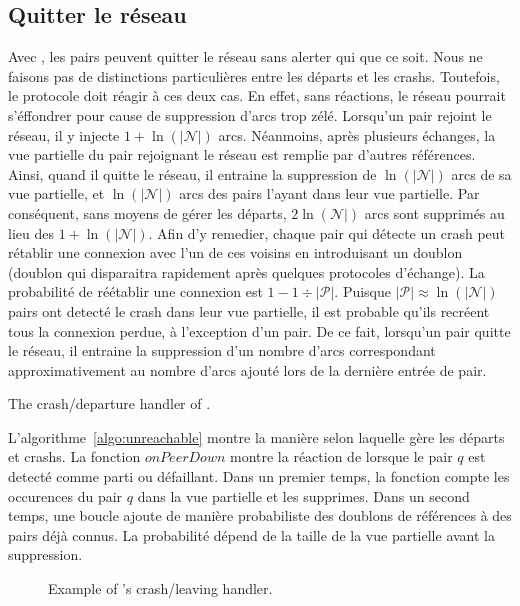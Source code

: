 \subsection{Quitter le réseau}

Avec \SPRAY, les pairs peuvent quitter le réseau sans alerter qui que ce
soit. Nous ne faisons pas de distinctions particulières entre les départs et les
crashs. Toutefois, le protocole doit réagir à ces deux cas. En effet, sans
réactions, le réseau pourrait s'éffondrer pour cause de suppression d'arcs trop
zélé. Lorsqu'un pair rejoint le réseau, il y injecte $1+\ln(|\mathcal{N}|)$
arcs. Néanmoins, après plusieurs échanges, la vue partielle du pair rejoignant
le réseau est remplie par d'autres références. Ainsi, quand il quitte le réseau,
il entraine la suppression de $\ln(|\mathcal{N}|)$ arcs de sa vue partielle, et
$\ln(|\mathcal{N}|)$ arcs des pairs l'ayant dans leur vue partielle. Par
conséquent, sans moyens de gérer les départs, $2\ln(\mathcal{N}|)$ arcs sont
supprimés au lieu des $1+\ln(|\mathcal{N}|)$. Afin d'y remedier, chaque pair qui
détecte un crash peut rétablir une connexion avec l'un de ces voisins en
introduisant un doublon (doublon qui disparaitra rapidement après quelques
protocoles d'échange). La probabilité de réétablir une connexion est
$1-1\div{|\mathcal{P}|}$. Puisque ${|\mathcal{P}|}\approx \ln(|\mathcal{N}|)$
pairs ont detecté le crash dans leur vue partielle, il est probable qu'ils
recréent tous la connexion perdue, à l'exception d'un pair. De ce fait,
lorsqu'un pair quitte le réseau, il entraine la suppression d'un nombre d'arcs
correspondant approximativement au nombre d'arcs ajouté lors de la dernière
entrée de pair.

\begin{algorithm}[h]
  
  \caption{\label{algo:unreachable}The crash/departure handler of \SPRAY.}
\end{algorithm}

L'algorithme~\ref{algo:unreachable} montre la manière selon laquelle \SPRAY gère
les départs et crashs. La fonction $onPeerDown$ montre la réaction de \SPRAY
lorsque le pair $q$ est detecté comme parti ou défaillant. Dans un premier
temps, la fonction compte les occurences du pair $q$ dans la vue partielle et
les supprimes. Dans un second temps, une boucle ajoute de manière probabiliste
des doublons de références à des pairs déjà connus. La probabilité dépend de la
taille de la vue partielle avant la suppression.

\begin{figure*}
  \centering
  \hspace{10pt}
  \hspace{10pt}
  \caption{\label{fig:crashexample}Example of \SPRAY's crash/leaving
    handler. }
\end{figure*}


